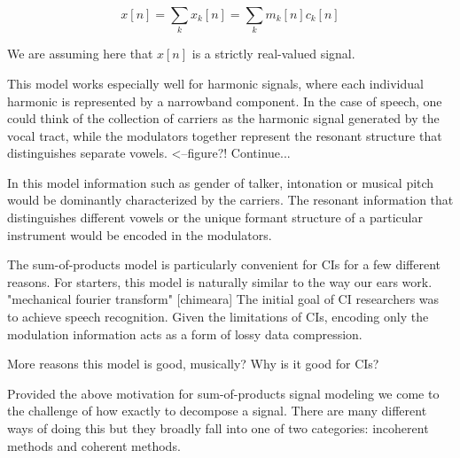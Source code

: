 \documentclass [11pt, proquest] {uwthesis}[2015/03/03]
\begin{document}

\begin{equation}
\label{eq:sum-of-products}
x[n] = \sum\limits_k x_k[n] = \sum\limits_k m_k[n] c_k[n]
\end{equation}


We are assuming here that $x[n]$ is a strictly real-valued signal.

This model works especially well for harmonic signals, where each individual harmonic is represented by a narrowband component.  In the case of speech, one could think of the collection of carriers as the harmonic signal generated by the vocal tract, while the modulators together represent the resonant structure that distinguishes separate vowels. <--figure?!  Continue...

In this model information such as gender of talker, intonation or musical pitch would be dominantly characterized by the carriers.  The resonant information that distinguishes different vowels or the unique formant structure of a particular instrument would be encoded in the modulators.

The sum-of-products model is particularly convenient for CIs for a few different reasons. For starters, this model is naturally similar to the way our ears work. "mechanical fourier transform" [chimeara] The initial goal of CI researchers was to achieve speech recognition.  Given the limitations of CIs, encoding only the modulation information acts as a form of lossy data compression.

More reasons this model is good, musically?
Why is it good for CIs?

Provided the above motivation for sum-of-products signal modeling we come to the challenge of how exactly to decompose a signal.  There are many different ways of doing this but they broadly fall into one of two categories: incoherent methods and coherent methods.
\end{document}
